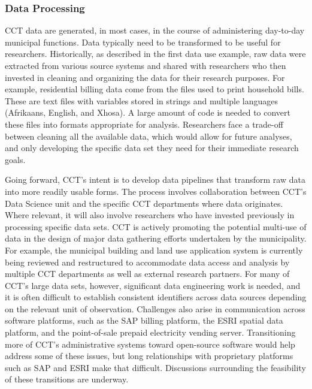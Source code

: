 \documentclass[
]{WileySix}
\begin{document}
\hypertarget{data-processing}{%
\subsubsection{Data Processing}\label{data-processing}}

CCT data are generated, in most cases, in the course of administering day-to-day municipal functions. Data typically need to be transformed to be useful for researchers. Historically, as described in the first data use example, raw data were extracted from various source systems and shared with researchers who then invested in cleaning and organizing the data for their research purposes. For example, residential billing data come from the files used to print household bills. These are text files with variables stored in strings and multiple languages (Afrikaans, English, and Xhosa). A large amount of code is needed to convert these files into formats appropriate for analysis. Researchers face a trade-off between cleaning all the available data, which would allow for future analyses, and only developing the specific data set they need for their immediate research goals.

Going forward, CCT's intent is to develop data pipelines that transform raw data into more readily usable forms. The process involves collaboration between CCT's Data Science unit and the specific CCT departments where data originates. Where relevant, it will also involve researchers who have invested previously in processing specific data sets. CCT is actively promoting the potential multi-use of data in the design of major data gathering efforts undertaken by the municipality. For example, the municipal building and land use application system is currently being reviewed and restructured to accommodate data access and analysis by multiple CCT departments as well as external research partners. For many of CCT's large data sets, however, significant data engineering work is needed, and it is often difficult to establish consistent identifiers across data sources depending on the relevant unit of observation. Challenges also arise in communication across software platforms, such as the SAP billing platform, the ESRI spatial data platform, and the point-of-sale prepaid electricity vending server. Transitioning more of CCT's administrative systems toward open-source software would help address some of these issues, but long relationships with proprietary platforms such as SAP and ESRI make that difficult. Discussions surrounding the feasibility of these transitions are underway.
\end{document}
